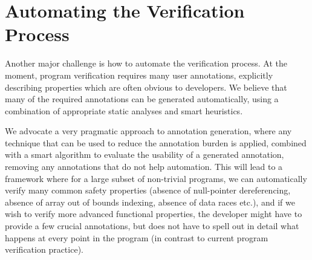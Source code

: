 

\section{Automating the Verification Process}\label{sec:automation}

Another major challenge is how to automate the verification process.
At the moment, program verification requires many user annotations, explicitly describing properties which are often obvious to developers. We believe that many of the required annotations can be generated automatically, using a combination of appropriate static analyses and smart heuristics. 

We  advocate a very pragmatic approach to annotation generation, where any technique that can be used to reduce the annotation burden is applied, combined with a smart algorithm to evaluate the usability of a generated annotation, removing any annotations that do not help automation.  This will lead to a framework where for a large subset of non-trivial programs, we can automatically verify many common safety properties (absence of null-pointer dereferencing, absence of array out of bounds indexing, absence of data races etc.), and if we wish to verify more advanced functional properties, the developer might have to provide a few crucial annotations, but does not have to spell out in detail what happens at every point in the program (in contrast to current program verification practice). 




